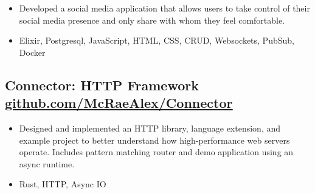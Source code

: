 \documentclass{article}
\begin{document}
\begin{itemize}
    \item Developed a social media application that allows users to take control of their social media presence and only share with whom they feel comfortable.
    \item Elixir, Postgresql, JavaScript, HTML, CSS, CRUD, Websockets, PubSub, Docker
\end{itemize}

\subsection{Connector: HTTP Framework \href{https://github.com/McRaeAlex/connector}{\underline{github.com/McRaeAlex/Connector}}}

\begin{itemize}
    \item Designed and implemented an HTTP library, language extension, and example project to better understand how high-performance web servers operate. Includes pattern matching router and demo application using an async runtime.
    \item Rust, HTTP, Async IO
\end{itemize}
\end{document}
